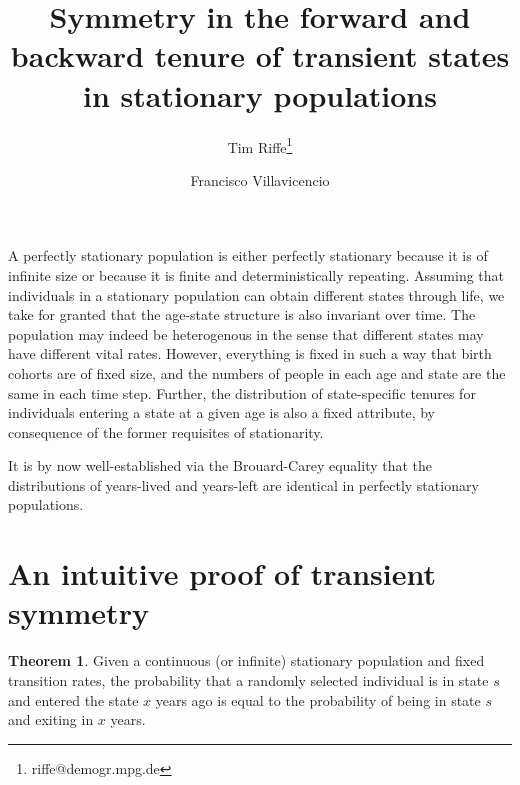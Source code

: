 \documentclass[12pt,oneside,a4paper]{article} %
\theoremstyle{definition}
\newtheorem{theorem}{Theorem}[section]
\begin{document}
\title{Symmetry in the forward and backward tenure of transient states in
stationary populations}
\author[1]{Tim Riffe\thanks{riffe@demogr.mpg.de}}
\author[2,3]{Francisco Villavicencio}

\maketitle

\begin{abstract}

\end{abstract}

A perfectly stationary population is either perfectly stationary because it is
of infinite size or because it is finite and deterministically repeating.
Assuming that individuals in a stationary population can obtain different states
through life, we take for granted that the age-state structure is also invariant
over time. The population may indeed be heterogenous in the sense that different
states may have different vital rates. However, everything is fixed in such a
way that birth cohorts are of fixed size, and the numbers of people in each age
and state are the same in each time step. Further, the distribution of
state-specific tenures for individuals entering a state at a given age is also a
fixed attribute, by consequence of the former requisites of stationarity. 

It is by now well-established via the Brouard-Carey equality
\citep{brouard1989mouvements,Vaupel2009,rao2014,villavicencioRiffeSymmetires2016}
that the distributions of years-lived and years-left are identical in perfectly stationary populations.



\section{An intuitive proof of transient symmetry}

\begin{theorem}
Given a continuous (or infinite) stationary population and fixed transition
rates, the probability that a randomly selected individual is in state $s$ and entered the state $x$ years
ago is equal to the probability of being in state $s$ and exiting in $x$ years.
\end{theorem}
\end{document}
